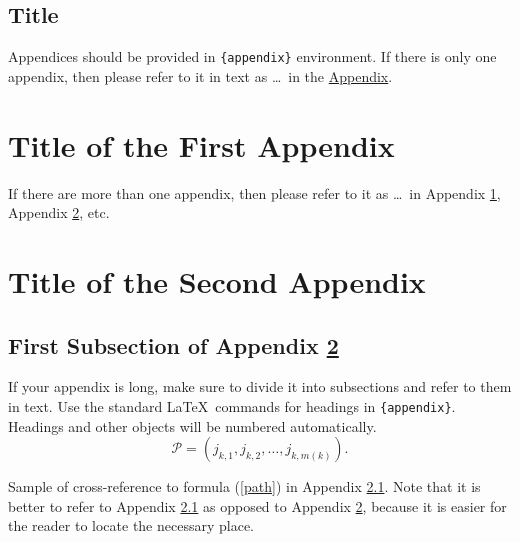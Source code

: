 \documentclass[ecta,nameyear,draft]{econsocart}
\theoremstyle{plain}
\theoremstyle{remark}
\begin{document}
\begin{appendix}
\section*{Title}\label{appn} %
Appendices should be provided in \verb|{appendix}| environment. If there is only one appendix,
then please refer to it in text as \ldots\ in the \hyperref[appn]{Appendix}.
\end{appendix}

\begin{appendix}
\section{Title of the First Appendix}\label{appA}
If there are more than one appendix, then please refer to it
as \ldots\ in Appendix \ref{appA}, Appendix \ref{appB}, etc.

\section{Title of the Second Appendix}\label{appB}
\subsection{First Subsection of Appendix \protect\ref{appB}}\label{appB1}

If your appendix is long, make sure to divide it into subsections and refer to them in text. Use the standard \LaTeX\ commands for headings in \verb|{appendix}|.
Headings and other objects will be numbered automatically.
\begin{equation}
\mathcal{P}=(j_{k,1},j_{k,2},\dots,j_{k,m(k)}). \label{path}
\end{equation}

Sample of cross-reference to formula (\ref{path}) in Appendix \ref{appB1}.
Note that it is better to refer to Appendix \ref{appB1} as opposed to Appendix \ref{appB}, because it is easier for the reader to locate the necessary place. \end{appendix}
\end{document}

